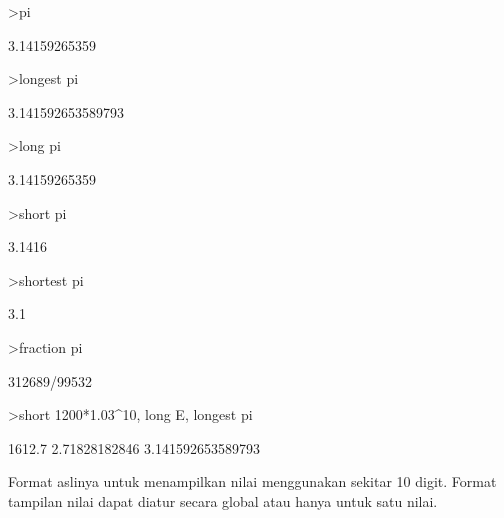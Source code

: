 \documentclass{article}
\newenvironment{eulernotebook}{\par}{\par}
\newenvironment{eulercomment}{\par\medskip}{\par\medskip}
\begin{document}
\begin{eulernotebook}
\begin{eulercomment}
\end{eulercomment}
\begin{eulerprompt}
>pi
\end{eulerprompt}
\begin{euleroutput}
  3.14159265359
\end{euleroutput}
\begin{eulerprompt}
>longest pi
\end{eulerprompt}
\begin{euleroutput}
        3.141592653589793 
\end{euleroutput}
\begin{eulerprompt}
>long pi
\end{eulerprompt}
\begin{euleroutput}
  3.14159265359
\end{euleroutput}
\begin{eulerprompt}
>short pi
\end{eulerprompt}
\begin{euleroutput}
  3.1416
\end{euleroutput}
\begin{eulerprompt}
>shortest pi
\end{eulerprompt}
\begin{euleroutput}
     3.1 
\end{euleroutput}
\begin{eulerprompt}
>fraction pi
\end{eulerprompt}
\begin{euleroutput}
  312689/99532
\end{euleroutput}
\begin{eulerprompt}
>short 1200*1.03^10, long E, longest pi
\end{eulerprompt}
\begin{euleroutput}
  1612.7
  2.71828182846
        3.141592653589793 
\end{euleroutput}
\begin{eulercomment}
Format aslinya untuk menampilkan nilai menggunakan sekitar 10 digit.
Format tampilan nilai dapat diatur secara global atau hanya untuk satu
nilai.


\end{eulercomment}
\end{eulernotebook}
\end{document}
